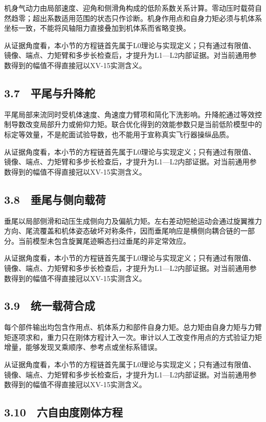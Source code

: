 \documentclass[UTF8,12pt,openany]{ctexbook}
\begin{document}
机身气动力由局部速度、迎角和侧滑角构成的低阶系数关系计算。零动压时载荷自然趋零；超出系数适用范围的状态只作诊断。机身作用点和自身力矩必须与机体系坐标一致，不能将风轴阻力直接叠加到机体系而省略变换。

从证据角度看，本小节的方程链首先属于L0理论与实现定义；只有通过有限值、镜像、端点、力矩臂和多步长检查后，才提升为L1—L2内部证据。对当前通用参数得到的幅值不得直接冠以XV-15实测含义。

\subsection{3.7　平尾与升降舵}

平尾局部来流同时受机体速度、角速度力臂项和简化下洗影响。升降舵通过等效控制导数改变局部升力或俯仰力矩。联合优化得到的效能参数只是当前低阶模型中的标定等效量，不是舵面试验导数，也不能用于宣称真实飞行器操纵品质。

从证据角度看，本小节的方程链首先属于L0理论与实现定义；只有通过有限值、镜像、端点、力矩臂和多步长检查后，才提升为L1—L2内部证据。对当前通用参数得到的幅值不得直接冠以XV-15实测含义。

\subsection{3.8　垂尾与侧向载荷}

垂尾以局部侧滑和动压生成侧向力及偏航力矩。左右差动短舱运动会通过旋翼推力方向、尾流覆盖和机体姿态破坏对称条件，因而垂尾响应是横侧向耦合链的一部分。当前模型未包含旋翼尾迹瞬态扫过垂尾的非定常效应。

从证据角度看，本小节的方程链首先属于L0理论与实现定义；只有通过有限值、镜像、端点、力矩臂和多步长检查后，才提升为L1—L2内部证据。对当前通用参数得到的幅值不得直接冠以XV-15实测含义。

\subsection{3.9　统一载荷合成}

每个部件输出均包含作用点、机体系力和部件自身力矩。总力矩由自身力矩与力臂矩逐项求和，重力只在刚体方程计入一次。审计以人工改变作用点的方式验证力矩增量，能够发现叉乘顺序、参考点或坐标系错误。

从证据角度看，本小节的方程链首先属于L0理论与实现定义；只有通过有限值、镜像、端点、力矩臂和多步长检查后，才提升为L1—L2内部证据。对当前通用参数得到的幅值不得直接冠以XV-15实测含义。

\subsection{3.10　六自由度刚体方程}
\end{document}
